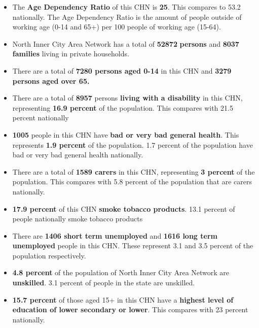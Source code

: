 \documentclass{article}
\begin{document}
\begin{itemize}

\item The \textbf{Age Dependency Ratio} of this CHN is  \textbf{25}. This compares to 53.2 nationally. The Age Dependency Ratio is the amount of people outside of working age (0-14 and 65+) per 100 people of working age (15-64). 

\item North Inner City Area Network has a total of \textbf{\num{52872}} \textbf{persons} and  \textbf{\num{8037}} \textbf{families} living in private households.

\item There are a total of \textbf{\num{7280} persons aged 0-14} in this CHN and \textbf{\num{3279} persons aged over 65.} 

\item There are a total of \textbf{\num{8957}} persons \textbf{living with a disability} in this CHN, representing \textbf{16.9 percent} of the population. This compares with  21.5 percent nationally

\item \textbf{\num{1005}} people in this CHN have \textbf{bad or very bad general health}. This represents \textbf{1.9 percent} of the population. 1.7 percent of the population have bad or very bad general health nationally. 

\item There are a total of \textbf{\num{1589} carers} in this CHN, representing \textbf{3 percent} of the population. This compares with 5.8 percent of the population that are carers nationally. 

\item \textbf{17.9 percent} of this CHN \textbf{smoke tobacco products}. 13.1 percent of people nationally smoke tobacco products

\item There are \textbf{\num{1406} short term unemployed} and \textbf{\num{1616} long term unemployed} people in this CHN. These represent 3.1 and 3.5 percent of the population respectively.

\item  \textbf{4.8 percent} of the population of North Inner City Area Network are \textbf{unskilled}. 3.1 percent of people in the state are unskilled.

\item \textbf{15.7 percent} of those aged 15+ in this CHN have a \textbf{highest level of education of lower secondary or lower}. This compares with 23 percent nationally. 


\end{itemize}
\end{document}
